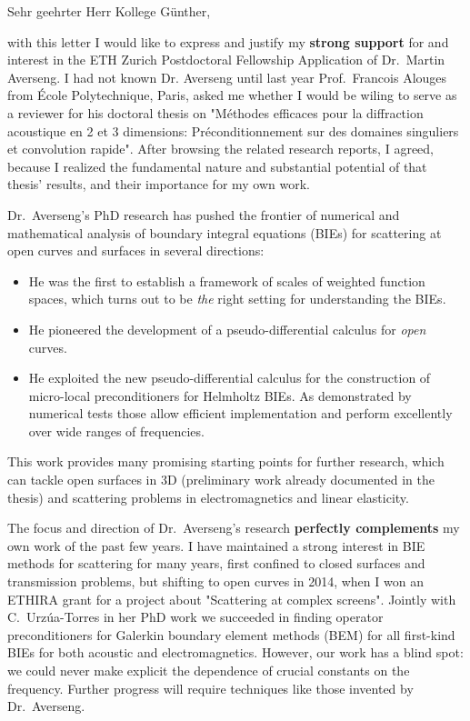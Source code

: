 \documentclass[english]{ethbrief3}
\begin{document}

\opening{Sehr geehrter Herr Kollege Günther,}

with this letter I would like to express and justify my \textbf{strong support} for and
interest in the ETH Zurich Postdoctoral Fellowship Application of Dr.~Martin Averseng. I
had not known Dr. Averseng until last year Prof.~Francois Alouges from \'Ecole
Polytechnique, Paris, asked me whether I would be wiling to serve as a reviewer for his
doctoral thesis on "Méthodes efficaces pour la diffraction acoustique en 2 et 3
dimensions: Préconditionnement sur des domaines singuliers et convolution rapide". After
browsing the related research reports, I agreed, because I realized the fundamental nature
and substantial potential of that thesis' results, and their importance for my own work.

Dr.~Averseng's PhD research has pushed the frontier of numerical and mathematical analysis
of boundary integral equations (BIEs) for scattering at open curves and surfaces in
several directions:
\begin{itemize}
\item He was the first to establish a framework of scales of weighted function spaces,
  which turns out to be \emph{the} right setting for understanding the BIEs.
\item He pioneered the development of a pseudo-differential calculus for \emph{open}
  curves.
\item He exploited the new pseudo-differential calculus for the construction of 
  micro-local preconditioners for Helmholtz BIEs. As demonstrated by numerical tests those
  allow efficient implementation and perform excellently over wide ranges of frequencies.
\end{itemize}
This work provides many promising starting points for further research, which can tackle open
surfaces in 3D (preliminary work already documented in the thesis) and scattering problems
in electromagnetics and linear elasticity.

The focus and direction of Dr.~Averseng's research \textbf{perfectly complements} my own
work of the past few years. I have maintained a strong interest in BIE methods for
scattering for many years, first confined to closed surfaces and transmission problems,
but shifting to open curves in 2014, when I won an ETHIRA grant for a project about
"Scattering at complex screens". Jointly with C.~Urz\'ua-Torres in her PhD work we
succeeded in finding operator preconditioners for Galerkin boundary element methods (BEM)
for all first-kind BIEs for both acoustic and electromagnetics. However, our work has a
blind spot: we could never make explicit the dependence of crucial constants on the
frequency. Further progress will require techniques like those invented by Dr.~Averseng.
\end{document}
